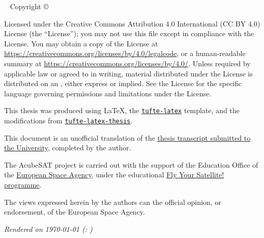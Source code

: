 \documentclass[a4paper,nobib,final]{tufte-book}
\begin{document}
\makeatother
\maketitle

\newpage
\begin{fullwidth}
~\vfill
\thispagestyle{empty}
\setlength{\parindent}{0pt}
\setlength{\parskip}{\baselineskip}
Copyright \copyright\ \the\year\ \thanklessauthor

\par{}

\par{}

\justify

\par Licensed under the Creative Commons Attribution 4.0 International (CC BY 4.0) License (the ``License''); you may not
use this file except in compliance with the License. You may obtain a copy
of the License at \url{https://creativecommons.org/licenses/by/4.0/legalcode}, or a human-readable summary at \url{https://creativecommons.org/licenses/by/4.0/}.
Unless
required by applicable law or agreed to in writing, material distributed
under the License is distributed on an , either express or implied. See the
License for the specific language governing permissions and limitations
under the License.

\par This thesis was produced using \LaTeX, the \href{https://ctan.org/pkg/tufte-latex?lang=en}{\texttt{tufte-latex}} template, and the modifications from \linebreak[4] \href{https://github.com/lalider/tufte-latex-thesis}{\texttt{tufte-latex-thesis}}.

\par This document is an unofficial translation of the \href{https://ikee.lib.auth.gr/record/332377/?ln=en}{thesis transcript submitted to the University}, completed by the author.

\par The AcubeSAT project is carried out with the support of the Education Office of the \href{https://www.esa.int/}{European Space Agency}, under the educational \href{https://www.esa.int/Education/CubeSats_-_Fly_Your_Satellite/}{Fly Your Satellite! programme}.

\par The views expressed herein by the authors can  the official opinion, or endorsement, of the European Space Agency.

\par\textit{Rendered on \today{} (\texttt{\gitcommit}: \gitcommitmessage)}
\end{fullwidth}
\end{document}
